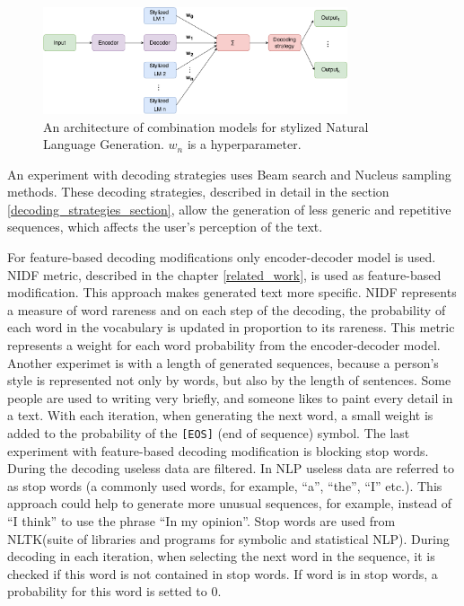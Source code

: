 \begin{figure}[hbt]
  \centering
  \includegraphics[width=0.8\textwidth]{figures/model.pdf}
  \caption{An architecture of combination models for stylized Natural Language Generation. $w_n$ is a hyperparameter.}
  \label{architecture_nlg}
\end{figure}

An experiment with decoding strategies uses Beam search and Nucleus sampling methods. These decoding strategies, described in detail in the section \ref{decoding_strategies_section}, allow the generation of less generic and repetitive sequences, which affects the user's perception of the text.

For feature-based decoding modifications only encoder-decoder model is used. NIDF metric, described in the chapter \ref{related_work}, is used as feature-based modification. This approach makes generated text more specific. NIDF represents a measure of word rareness and on each step of the decoding, the probability of each word in the vocabulary is updated in proportion to its rareness. This metric represents a weight for each word probability from the encoder-decoder model. Another experimet is with a length of generated sequences, because a person's style is represented not only by words, but also by the length of sentences. Some people are used to writing very briefly, and someone likes to paint every detail in a text. With each iteration, when generating the next word, a small weight is added to the probability of the \texttt{[EOS]} (end of sequence) symbol. The last experiment with feature-based decoding modification is blocking stop words. During the decoding useless data are filtered. In NLP useless data are referred to as stop words (a commonly used words, for example, ``a'', ``the'', ``I'' etc.). This approach could help to generate more unusual sequences, for example, instead of ``I think'' to use the phrase ``In my opinion''. Stop words are used from NLTK\protect\footnotemark (suite of libraries and programs for symbolic and statistical NLP). During decoding in each iteration, when selecting the next word in the sequence, it is checked if this word is not contained in stop words. If word is in stop words, a probability for this word is setted to 0.

